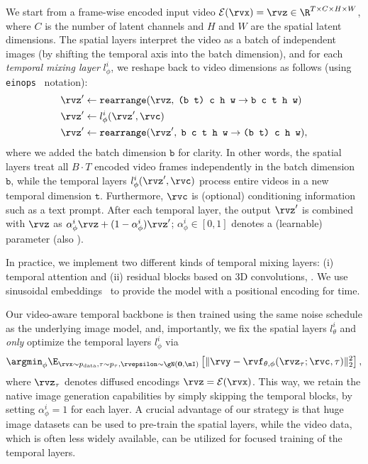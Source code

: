 We start from a frame-wise encoded input video $\mathcal{E}(\rvx)=\rvz \in \R^{T \times C \times H \times W}$, 
where $C$ is the number of latent channels and $H$ and $W$ are the spatial latent dimensions.
The spatial layers interpret the video as a batch of independent images (by shifting the temporal axis into the batch dimension), and for each \emph{temporal mixing layer} $l_\phi^i$, we reshape back to video dimensions as follows (using \texttt{einops}~\cite{rogozhnikov2022einops} notation):
\begin{align*}
\rvz' &\leftarrow \texttt{rearrange}(\rvz, \; \texttt{(b t) c h w} \rightarrow \texttt{b c t h w}) \\
\rvz' &\leftarrow l_\phi^i(\rvz', \rvc) \\
\rvz' &\leftarrow \texttt{rearrange}(\rvz', \; \texttt{b c t h w} \rightarrow \texttt{(b t) c h w}) ,
\end{align*}
where we added the batch dimension $\texttt{b}$ for clarity. %
In other words, the spatial layers treat all $B{\cdot}T$ encoded video frames independently in the batch dimension $\texttt{b}$, while the temporal layers $l_\phi^i(\rvz', \rvc)$ process entire videos in a new temporal dimension $\texttt{t}$. Furthermore, $\rvc$ is (optional) conditioning information such as a text prompt.
After each temporal layer, the output $\rvz'$ is combined with $\rvz$ as
$\alpha_\phi^i \rvz + (1 - \alpha_\phi^i) \rvz'$; 
$\alpha_\phi^i\in[0,1]$ denotes a (learnable) parameter (also ).

In practice, we implement two different kinds of temporal mixing layers: (i) temporal attention and (ii) residual blocks based on 3D convolutions, \cf {}. We use sinusoidal embeddings~\cite{vaswani2017attention,ho2020ddpm} to provide the model with a positional encoding for time. 

Our video-aware temporal backbone is then trained using the same noise schedule as the underlying image model, and, importantly, we fix the spatial layers $l_\theta^i$ and \emph{only} optimize the temporal layers $l_\phi^i$ via
{\small\begin{align}
\argmin_{\phi} \E_{\rvx\sim p_{\text{data}}, \tau \sim p_{\tau}, \rvepsilon \sim \gN(\mathbf{0}, \mI)} \left[\Vert \rvy - \rvf_{\theta, \phi}(\rvz_\tau; \rvc, \tau) \Vert_2^2 \right],
\label{eq:videoobjective}
\end{align}}
where $\rvz_\tau$ denotes diffused encodings $\rvz=\mathcal{E}(\rvx)$.
This way, we retain the native image generation capabilities by simply skipping the temporal blocks, \eg by setting $\alpha_\phi^i = 1$ for each layer. A crucial advantage of our strategy is that huge image datasets can be used to pre-train the spatial layers, while the video data, which is often less widely available, can be utilized for focused training of the temporal layers.

